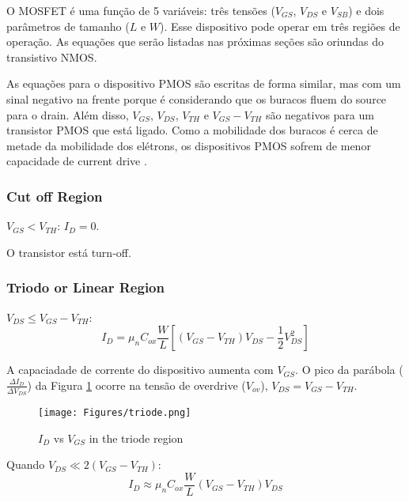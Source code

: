 \documentclass[10pt, conference,a4paper]{IEEEtran}
\begin{document}
O MOSFET é uma função de 5 variáveis: três tensões ($V_{GS}$, $V_{DS}$ e $V_{SB}$) e dois parâmetros de tamanho ($L$ e $W$). Esse dispositivo pode operar em três regiões de operação. As equações que serão listadas nas próximas seções são oriundas do transistivo NMOS. 

As equações para o dispositivo PMOS são escritas de forma similar, mas com um sinal negativo na frente porque é considerando que os buracos fluem do source para o drain. Além disso, $V_{GS}$, $V_{DS}$, $V_{TH}$ e $V_{GS}-V_{TH}$ são negativos para um transistor PMOS que está ligado. Como a mobilidade dos buracos é cerca de metade da mobilidade dos elétrons, os dispositivos PMOS sofrem de menor capacidade de current drive \cite{razavi2005design}.


\subsubsection{Cut off Region}
  
$V_{GS} < V_{TH}$: $I_D = 0$.

O transistor está turn-off.
    
\subsubsection{Triodo or Linear Region}
    
    $V_{DS} \leq V_{GS} - V_{TH}$:
    \begin{equation}        
    I_D = \mu_n C_{ox} \frac{W}{L} \left [(V_{GS} - V_{TH})V_{DS} - \frac{1}{2}V_{DS}^2 \right]
\label{eq:triode}
    \end{equation}
    
    A capaciadade de corrente do dispositivo aumenta com $V_{GS}$. O pico da parábola ($\frac{\Delta I_D}{\Delta V_{DS}}$) da Figura \ref{fig:triode} ocorre na tensão de overdrive ($V_{ov}$), $V_{DS} = V_{GS} - V_{TH}$.
    
    \begin{figure}[h]
    \centering
    \texttt{[image: Figures/triode.png]}
    \caption{$I_D$ vs $V_{GS}$ in the triode region}
    \label{fig:triode}
    \end{figure}

    Quando $V_{DS} \ll 2(V_{GS} - V_{TH})$:
    \begin{equation}
    I_D \approx \mu_n C_{ox} \frac{W}{L} (V_{GS} - V_{TH})V_{DS}
    \label{eq:deep_triode}
  \end{equation}  
  
\end{document}
